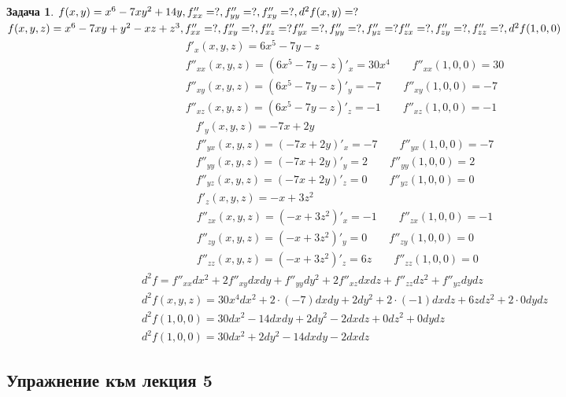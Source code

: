 \documentclass[a4paper,fleqn,12pt]{article}
\newtheorem{task}{Задача}[section]
\begin{document}
\begin{task}
$f(x,y) = x^6 - 7xy^2 + 14y,\\
f''_{xx} = ?, f''_{yy} = ?, f''_{xy} = ?, d^2f(x,y) = ?$\\
$f(x,y,z) = x^6 - 7xy +y^2 - xz + z^3 ,  \\
f''_{xx} = ?, f''_{xy} = ?, f''_{xz} = ?  f''_{yx} = ?, f''_{yy} = ?, f''_{yz} = ?  f''_{zx} = ?, f''_{zy} = ?, f''_{zz} = ?, d^2f(1,0,0)$
\begin{gather*}
f'_x(x,y,z) = 6x^5 - 7y - z\\
f''_{xx}(x,y,z) = (6x^5 - 7y - z)'_x = 30x^4 \qquad f''_{xx}(1,0,0) = 30 \\
f''_{xy}(x,y,z) = (6x^5 - 7y - z)'_y = -7 \qquad f''_{xy}(1,0,0) = -7 \\
f''_{xz}(x,y,z) = (6x^5 - 7y - z)'_z = -1 \qquad f''_{xz}(1,0,0) = -1 
\end{gather*}
\begin{gather*}
f'_y(x,y,z) = -7x + 2y\\
f''_{yx}(x,y,z) = (-7x + 2y)'_x = -7 \qquad f''_{yx}(1,0,0) = -7 \\
f''_{yy}(x,y,z) = (-7x + 2y)'_y = 2 \qquad f''_{yy}(1,0,0) = 2 \\
f''_{yz}(x,y,z) = (-7x + 2y)'_z = 0\qquad f''_{yz}(1,0,0) = 0 
\end{gather*}
\begin{gather*}
f'_z(x,y,z) = -x + 3z^2\\
f''_{zx}(x,y,z) = (-x + 3z^2)'_x = -1 \qquad f''_{zx}(1,0,0) = -1 \\
f''_{zy}(x,y,z) = (-x + 3z^2)'_y = 0 \qquad f''_{zy}(1,0,0) = 0 \\
 f''_{zz}(x,y,z) = (-x + 3z^2)'_z = 6z  \qquad f''_{zz}(1,0,0) = 0 
\end{gather*}
\begin{gather*}
d^2f = f''_{xx}dx^2 + 2f''_{xy}dxdy + f''_{yy}dy^2 + 2f''_{xz}dxdz +  f''_{zz}dz^2 + f''_{yz}dydz\\
d^2f(x,y,z) = 30x^4dx^2 +2\cdot(-7) dxdy + 2dy^2 + 2\cdot(-1)dxdz + 6zdz^2 + 2\cdot 0 dydz \\
d^2f(1,0,0) = 30dx^2 -14dxdy + 2dy^2 - 2dxdz + 0dz^2 + 0 dydz \\
d^2f(1,0,0) = 30dx^2 + 2dy^2 -14dxdy - 2dxdz 
\end{gather*}

\end{task}
\newpage

\subsection{Упражнение към лекция 5}
\end{document}
